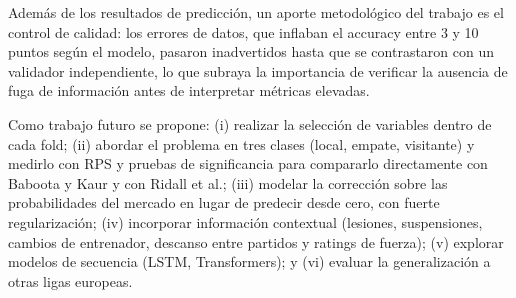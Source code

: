 \documentclass[12pt,letterpaper,oneside]{report}
\begin{document}
Además de los resultados de predicción, un aporte metodológico del trabajo es el control de calidad: los errores de datos, que inflaban el accuracy entre 3 y 10 puntos según el modelo, pasaron inadvertidos hasta que se contrastaron con un validador independiente, lo que subraya la importancia de verificar la ausencia de fuga de información antes de interpretar métricas elevadas.

Como trabajo futuro se propone: (i) realizar la selección de variables dentro de cada fold; (ii) abordar el problema en tres clases (local, empate, visitante) y medirlo con RPS y pruebas de significancia para compararlo directamente con Baboota y Kaur y con Ridall et al.; (iii) modelar la corrección sobre las probabilidades del mercado en lugar de predecir desde cero, con fuerte regularización; (iv) incorporar información contextual (lesiones, suspensiones, cambios de entrenador, descanso entre partidos y ratings de fuerza); (v) explorar modelos de secuencia (LSTM, Transformers); y (vi) evaluar la generalización a otras ligas europeas.

\clearpage
\end{document}
